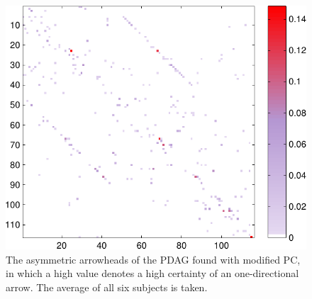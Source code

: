 \documentclass[a4paper, 10pt, english, onecolumn]{article}
\begin{document}
\begin{figure}[h!]
  \centering
  \includegraphics{images/arrowheads_avg_mod}
  \caption{The asymmetric arrowheads of the PDAG found with modified PC, in which a high value denotes a high certainty of an one-directional arrow. The average of all six subjects is taken.}
  \label{fig:pdag_avg_antisymmetric_mod}
\end{figure}
\end{document}
